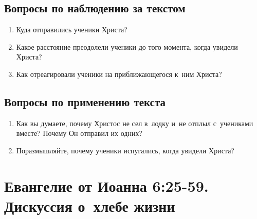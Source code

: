 \documentclass[a4paper,12pt]{article}
\begin{document}
\subsection*{Вопросы по наблюдению за текстом}
\begin{enumerate}
    \item Куда отправились ученики Христа? 
    
    \myline
    \item Какое расстояние преодолели ученики до того момента, когда увидели Христа? 
    
    \myline
    
    \item Как отреагировали ученики на приближающегося к~ним Христа? 
    
    \myline
\end{enumerate}

\subsection*{Вопросы по применению текста} 
\begin{enumerate}
    \item Как вы думаете, почему Христос не сел в~лодку и~не отплыл с~учениками вместе? Почему Он отправил их одних? 
    
    \myline
    
    \myline
    \item Поразмышляйте, почему ученики испугались, когда увидели Христа? 
    
    \myline
    
    \myline
\end{enumerate}



\section{Евангелие от Иоанна 6:25-59. Дискуссия о~хлебе жизни}
\end{document}
